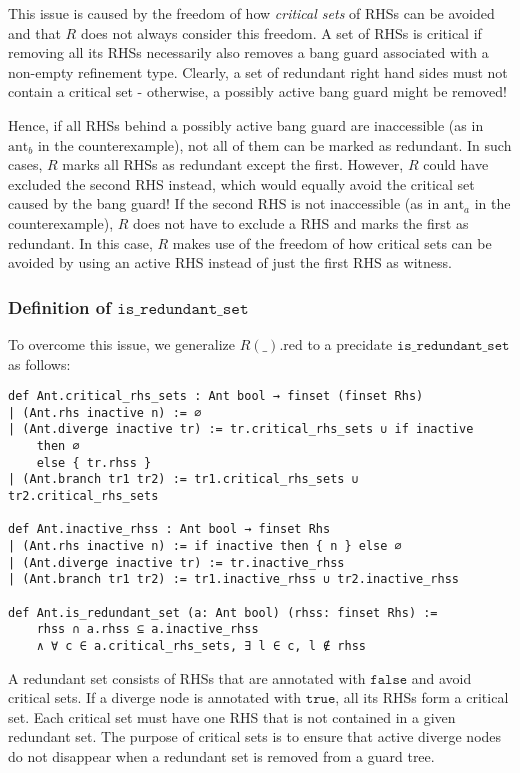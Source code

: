 This issue is caused by the freedom of how \textit{critical sets} of RHSs can be avoided and that $R$ does not always consider this freedom.
A set of RHSs is critical if removing all its RHSs necessarily also removes a bang guard associated with a non-empty refinement type.
Clearly, a set of redundant right hand sides must not contain a critical set - otherwise, a possibly active bang guard might be removed!

Hence, if all RHSs behind a possibly active bang guard are inaccessible (as in $\mathrm{ant}_b$ in the counterexample), not all of them can be marked as redundant.
In such cases, $R$ marks all RHSs as redundant except the first.
However, $R$ could have excluded the second RHS instead, which would equally avoid the critical set caused by the bang guard!
If the second RHS is not inaccessible (as in $\mathrm{ant}_a$ in the counterexample), $R$ does not have to exclude a RHS and marks the first as redundant. In this case, $R$ makes use of the freedom of how critical sets can be avoided by using an active RHS instead of just the first RHS as witness.

\subsubsection{Definition of $\mathtt{is\_redundant\_set}$}

To overcome this issue, we generalize $R(\_).\mathrm{red}$ to a precidate $\mathtt{is\_redundant\_set}$ as follows:

\begin{verbatim}
def Ant.critical_rhs_sets : Ant bool → finset (finset Rhs)
| (Ant.rhs inactive n) := ∅
| (Ant.diverge inactive tr) := tr.critical_rhs_sets ∪ if inactive
    then ∅
    else { tr.rhss }
| (Ant.branch tr1 tr2) := tr1.critical_rhs_sets ∪ tr2.critical_rhs_sets

def Ant.inactive_rhss : Ant bool → finset Rhs
| (Ant.rhs inactive n) := if inactive then { n } else ∅
| (Ant.diverge inactive tr) := tr.inactive_rhss
| (Ant.branch tr1 tr2) := tr1.inactive_rhss ∪ tr2.inactive_rhss

def Ant.is_redundant_set (a: Ant bool) (rhss: finset Rhs) :=
    rhss ∩ a.rhss ⊆ a.inactive_rhss
    ∧ ∀ c ∈ a.critical_rhs_sets, ∃ l ∈ c, l ∉ rhss
\end{verbatim}

A redundant set consists of RHSs that are annotated with $\mathtt{false}$ and avoid critical sets.
If a diverge node is annotated with $\mathtt{true}$, all its RHSs form a critical set.
Each critical set must have one RHS that is not contained in a given redundant set.
The purpose of critical sets is to ensure that active diverge nodes do not disappear when a redundant set is removed from a guard tree.

